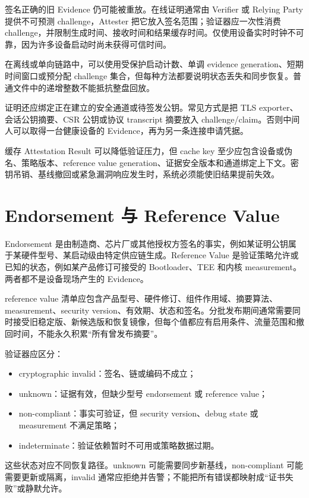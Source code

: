签名正确的旧 Evidence 仍可能被重放。在线证明通常由 Verifier 或 Relying Party 提供不可预测 challenge，Attester 把它放入签名范围；验证器应一次性消费 challenge，并限制生成时间、接收时间和结果缓存时间。仅使用设备实时时钟不可靠，因为许多设备启动时尚未获得可信时间。

在离线或单向链路中，可以使用受保护启动计数、单调 evidence generation、短期时间窗口或预分配 challenge 集合，但每种方法都要说明状态丢失和同步恢复。普通文件中的递增整数不能抵抗整盘回放。

证明还应绑定正在建立的安全通道或待签发公钥。常见方式是把 TLS exporter、会话公钥摘要、CSR 公钥或协议 transcript 摘要放入 challenge/claim。否则中间人可以取得一台健康设备的 Evidence，再为另一条连接申请凭据。

缓存 Attestation Result 可以降低验证压力，但 cache key 至少应包含设备或伪名、策略版本、reference value generation、证据安全版本和通道绑定上下文。密钥吊销、基线撤回或紧急漏洞响应发生时，系统必须能使旧结果提前失效。

\section{Endorsement 与 Reference Value}

Endorsement 是由制造商、芯片厂或其他授权方签名的事实，例如某证明公钥属于某硬件型号、某启动级由特定供应链生成。Reference Value 是验证策略允许或已知的状态，例如某产品修订可接受的 Bootloader、TEE 和内核 measurement。两者都不是设备现场产生的 Evidence。

reference value 清单应包含产品型号、硬件修订、组件作用域、摘要算法、measurement、security version、有效期、状态和签名。分批发布期间通常需要同时接受旧稳定版、新候选版和恢复镜像，但每个值都应有启用条件、流量范围和撤回时间，不能永久积累“所有曾发布摘要”。

验证器应区分：

\begin{itemize}
  \item cryptographic invalid：签名、链或编码不成立；
  \item unknown：证据有效，但缺少型号 endorsement 或 reference value；
  \item non-compliant：事实可验证，但 security version、debug state 或 measurement 不满足策略；
  \item indeterminate：验证依赖暂时不可用或策略数据过期。
\end{itemize}

这些状态对应不同恢复路径。unknown 可能需要同步新基线，non-compliant 可能需要更新或隔离，invalid 通常应拒绝并告警；不能把所有错误都映射成“证书失败”或静默允许。

